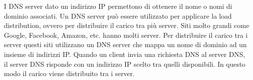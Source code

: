 \documentclass[12pt]{article}
\begin{document}
I DNS server dato un indirizzo IP permettono di ottenere il nome o nomi di dominio associati.
Un DNS server può essere utilizzato per applicare la load distribution, ovvero per distribuire il carico tra più server.
Siti molto grandi come Google, Facebook, Amazon, etc. hanno molti server.
Per distribuire il carico tra i server questi siti utilizzano un DNS server che mappa un nome di dominio ad un insieme di indirizzi IP.
Quando un client invia una richiesta DNS al server DNS, il server DNS risponde con un indirizzo IP scelto tra quelli disponibili.
In questo modo il carico viene distribuito tra i server.



    
\end{document}
